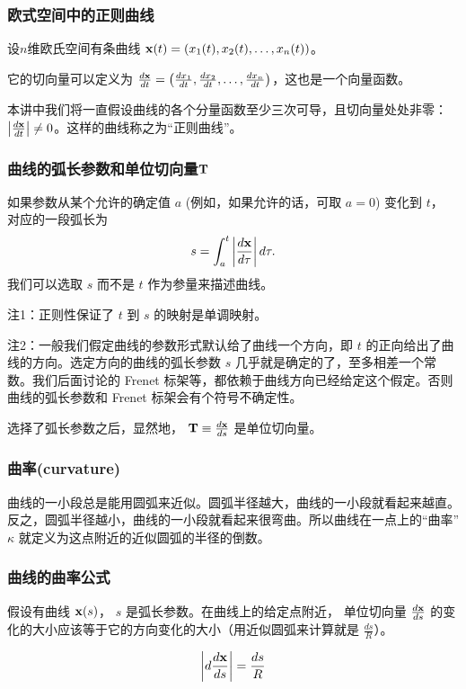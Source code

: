 \documentclass[CJK,13pt]{beamer}
\date{}
\begin{document}
  \bch
{}


\begin{frame}
  \frametitle{欧式空间中的正则曲线}
  设$n$维欧氏空间有条曲线 ${\mathbf{x}}(t) = \left(x_1(t), x_2(t), \ldots, x_n(t)\right)$。

  \skipline

  它的切向量可以定义为 $\frac{d{\mathbf{x}}}{dt} = \left(\frac{dx_1}{dt}, \frac{dx_2}{dt}, \ldots, \frac{dx_n}{dt}\right)$，这也是一个向量函数。

  \skipline
  
  本讲中我们将一直假设曲线的各个分量函数至少三次可导，且切向量处处非零： $\left\vert\frac{d{\mathbf{x}}}{dt}\right\vert\ne 0$。这样的曲线称之为“{\blue 正则曲线}”。

\end{frame}



\begin{frame}
  \frametitle{曲线的弧长参数和单位切向量${\mathbf{T}}$}
  如果参数从某个允许的确定值 $a$ (例如，如果允许的话，可取 $a=0$) 变化到 $t$， 对应的一段弧长为
  $$ s = \int_a^t \left\vert\frac{d{\mathbf{x}}}{d\tau}\right\vert d\tau. $$
  我们可以选取 $s$ 而不是 $t$ 作为参量来描述曲线。
  
  {\scriptsize 注1：正则性保证了 $t$ 到 $s$ 的映射是单调映射。}

  \skipline

  {\scriptsize 注2：一般我们假定曲线的参数形式默认给了曲线一个方向，即 $t$ 的正向给出了曲线的方向。选定方向的曲线的弧长参数 $s$ 几乎就是确定的了，至多相差一个常数。我们后面讨论的 Frenet 标架等，都依赖于曲线方向已经给定这个假定。否则曲线的弧长参数和 Frenet 标架会有个符号不确定性。}

  \skipline
  
  选择了弧长参数之后，显然地， ${\mathbf{T}} \equiv \frac{d{\mathbf{x}}}{ds}$ 是{\blue 单位切向量}。  
\end{frame}


\begin{frame}
  \frametitle{曲率(curvature)}

  曲线的一小段总是能用圆弧来近似。圆弧半径越大，曲线的一小段就看起来越直。反之，圆弧半径越小，曲线的一小段就看起来很弯曲。所以曲线在一点上的{\blue “曲率” $\kappa$ 就定义为这点附近的近似圆弧的半径的倒数}。
  

\end{frame}



\begin{frame}
  \frametitle{曲线的曲率公式}

  假设有曲线 ${\mathbf{x}}(s)$， $s$ 是弧长参数。在曲线上的给定点附近， 单位切向量 $\frac{d{\mathbf{x}}}{ds}$ 的变化的大小应该等于它的方向变化的大小（用近似圆弧来计算就是 $\frac{ds}{R}$）。
  
  $$ \left\vert d \frac{d{\mathbf{x}}}{ds}\right\vert = \frac{ds}{R} $$



\end{frame}
\end{document}
